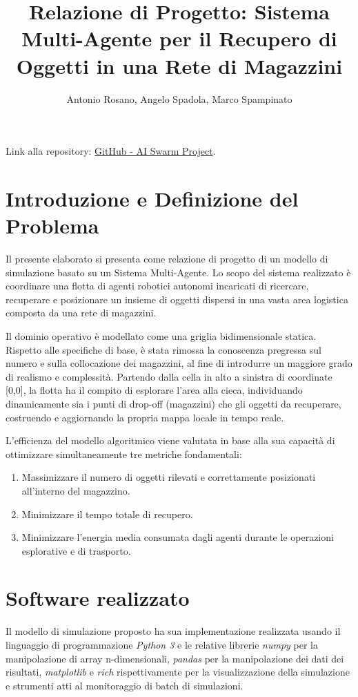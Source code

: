 \documentclass[11pt,a4paper]{article}
\title{\textbf{Relazione di Progetto: Sistema Multi-Agente per il Recupero di Oggetti in una Rete di Magazzini}}
\author{Antonio Rosano, Angelo Spadola, Marco Spampinato}
\date{}
\begin{document}
\maketitle

Link alla repository: \href{https://github.com/marcospampi/progetto-ai-swarm}{GitHub - AI Swarm Project}.

\section{Introduzione e Definizione del Problema}
Il presente elaborato si presenta come relazione di progetto di un modello di simulazione basato su un Sistema Multi-Agente. Lo scopo del sistema realizzato è coordinare una flotta di agenti robotici autonomi incaricati di ricercare, recuperare e posizionare un insieme di oggetti dispersi in una vasta area logistica composta da una rete di magazzini.

\vspace{0.3cm}
\noindent
Il dominio operativo è modellato come una griglia bidimensionale statica. Rispetto alle specifiche di base, è stata rimossa la conoscenza pregressa sul numero e sulla collocazione dei magazzini, al fine di introdurre un maggiore grado di realismo e complessità. Partendo dalla cella in alto a sinistra di coordinate [0,0], la flotta ha il compito di esplorare l'area alla cieca, individuando dinamicamente sia i punti di drop-off (magazzini) che gli oggetti da recuperare, costruendo e aggiornando la propria mappa locale in tempo reale.

\vspace{0.3cm}
\noindent
L'efficienza del modello algoritmico viene valutata in base alla sua capacità di ottimizzare simultaneamente tre metriche fondamentali:
\begin{enumerate}
    \item Massimizzare il numero di oggetti rilevati e correttamente posizionati all'interno del magazzino.
    \item Minimizzare il tempo totale di recupero.
    \item Minimizzare l'energia media consumata dagli agenti durante le operazioni esplorative e di trasporto.
\end{enumerate}

\section{Software realizzato}
Il modello di simulazione proposto ha sua implementazione realizzata usando il linguaggio di programmazione \textit{Python 3} e le relative librerie \textit{numpy} per la manipolazione di array n-dimensionali, \textit{pandas} per la manipolazione dei dati dei risultati, \textit{matplotlib} e \textit{rich} rispettivamente per la visualizzazione della simulazione e strumenti atti al monitoraggio di batch di simulazioni.
\vspace{0.3cm}
\end{document}
